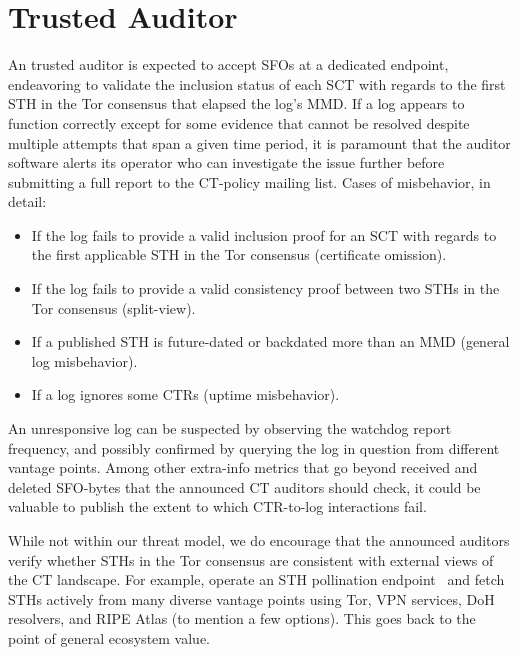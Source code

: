 \section{Trusted Auditor} \label{app:auditor}
An trusted auditor is expected to accept SFOs at a dedicated endpoint,
endeavoring to validate the inclusion status of each SCT with regards to the
first STH in the Tor consensus that elapsed the log's MMD.  If a log appears to
function correctly except for some evidence that cannot be
resolved despite multiple attempts that span a given time period, it is
paramount that the auditor software alerts its operator who can investigate
the issue further before submitting a full report to the CT-policy mailing list.
Cases of misbehavior, in detail:
\begin{itemize}
	\item If the log fails to provide a valid inclusion proof for an SCT with
		regards to the first applicable STH in the Tor consensus
		(certificate omission).
	\item If the log fails to provide a valid consistency proof between two
		STHs in the Tor consensus
		(split-view).
	\item If a published STH is future-dated or backdated more than an MMD
		(general log misbehavior).
	\item If a log ignores some CTRs (uptime misbehavior).
\end{itemize}

An unresponsive log can be suspected by observing the watchdog report frequency,
and possibly confirmed by querying the log in question from different vantage
points.  Among other extra-info metrics that go beyond received and deleted
SFO-bytes that the announced CT auditors should check, it could be valuable to
publish the extent to which CTR-to-log interactions fail.

While not within our threat model, we do encourage that the announced auditors
verify whether STHs in the Tor consensus are consistent with external views of
the CT landscape.  For example, operate an STH pollination
endpoint~\cite{nordberg} and fetch STHs actively from many diverse vantage
points using Tor, VPN services, DoH resolvers, and RIPE Atlas (to mention a few
options).  This goes back to the point of general ecosystem value.

